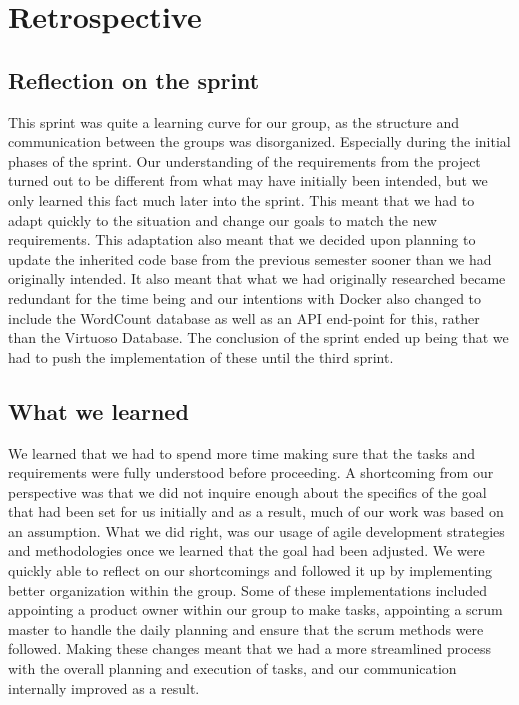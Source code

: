 \section{Retrospective}

\subsection{Reflection on the sprint}
This sprint was quite a learning curve for our group, as the structure and communication between the \knox{} groups was disorganized. Especially during the initial phases of the sprint. 
Our understanding of the requirements from the \knox{} project turned out to be different from what may have initially been intended, but we only learned this fact much later into the sprint. 
This meant that we had to adapt quickly to the situation and change our goals to match the new requirements. 
This adaptation also meant that we decided upon planning to update the inherited code base from the previous semester sooner than we had originally intended. 
It also meant that what we had originally researched became redundant for the time being and our intentions with Docker also changed to include the WordCount database as well as an API end-point for this, rather than the Virtuoso Database. 
The conclusion of the sprint ended up being that we had to push the implementation of these until the third sprint.

\subsection{What we learned}
We learned that we had to spend more time making sure that the tasks and requirements were fully understood before proceeding. 
A shortcoming from our perspective was that we did not inquire enough about the specifics of the goal that had been set for us initially and as a result, much of our work was based on an assumption. 
What we did right, was our usage of agile development strategies and methodologies once we learned that the goal had been adjusted. 
We were quickly able to reflect on our shortcomings and followed it up by implementing better organization within the group. 
Some of these implementations included appointing a product owner within our group to make tasks, appointing a scrum master to handle the daily planning and ensure that the scrum methods were followed. 
Making these changes meant that we had a more streamlined process with the overall planning and execution of tasks, and our communication internally improved as a result.

